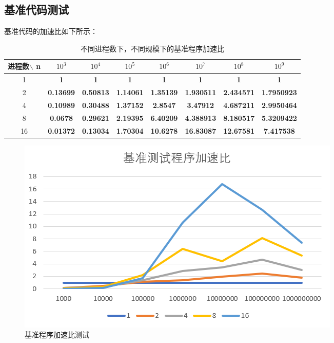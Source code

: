 \documentclass[a4paper,11pt,UTF8]{ctexart}
\begin{document}
\subsection{基准代码测试}
基准代码的加速比如下所示：\newpage
\begin{table}[ht]
\centering
\caption{不同进程数下，不同规模下的基准程序加速比}
\begin{tabular}{cccccccc}
  \toprule
  进程数$\backslash$ n & $10^3$             & $10^4$            & $10^5$           & $10^6$          & $10^7$          & $10^8$         & $10^9$         \\\midrule
  1   & \textbf{1}       & \textbf{1}       & \textbf{1}       & \textbf{1}       & \textbf{1}        & \textbf{1}        & \textbf{1}         \\
  2   & \textbf{0.13699} & \textbf{0.50813} & \textbf{1.14061} & \textbf{1.35139} & \textbf{1.930511} & \textbf{2.434571} & \textbf{1.7950923} \\
  4   & \textbf{0.10989} & \textbf{0.30488} & \textbf{1.37152} & \textbf{2.8547}  & \textbf{3.47912}  & \textbf{4.687211} & \textbf{2.9950464} \\
  8   & \textbf{0.0678}  & \textbf{0.29621} & \textbf{2.19395} & \textbf{6.40209} & \textbf{4.388913} & \textbf{8.180517} & \textbf{5.3209422} \\
  16  & \textbf{0.01372} & \textbf{0.13034} & \textbf{1.70304} & \textbf{10.6278} & \textbf{16.83087} & \textbf{12.67581} & \textbf{7.417538} \\\bottomrule
  \end{tabular}
\label{label}
  \end{table}
\begin {figure}[h]
\centering %
\includegraphics[width=\textwidth]{3535-041410.png}
\caption{基准程序加速比测试} %
\label{five}
\end {figure}
\end{document}
